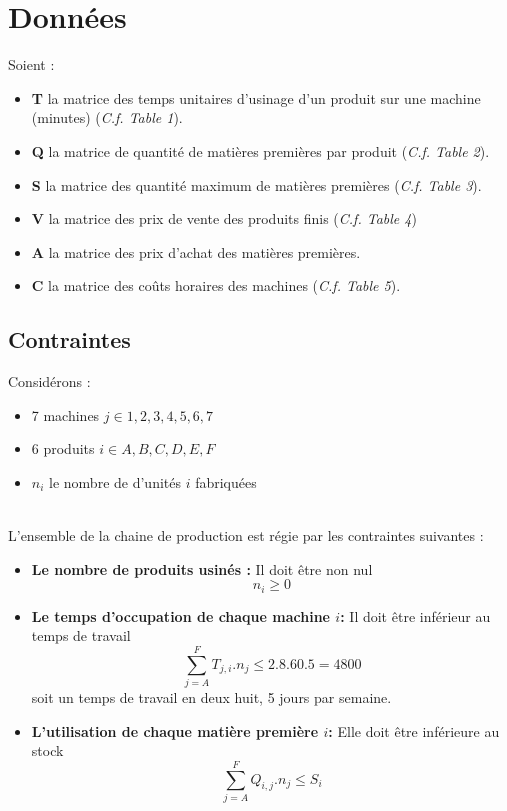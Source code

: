 
\section{Données}
Soient :
\begin{itemize}
  \item \textbf{T} la matrice des temps unitaires d'usinage d'un produit sur une
  machine (minutes) (\textsl{C.f. Table 1}).
  \item \textbf{Q} la matrice de quantité de matières premières par produit
  (\textsl{C.f. Table 2}).
  \item \textbf{S} la matrice des quantité maximum de matières premières
  (\textsl{C.f. Table 3}).
  \item \textbf{V} la matrice des prix de vente des produits finis (\textsl{C.f.
  Table 4})
  \item \textbf{A} la matrice des prix d'achat des matières premières.
  \item \textbf{C} la matrice des coûts horaires des machines (\textsl{C.f.
  Table 5}).
\end{itemize}

\subsection{Contraintes}
Considérons :
\begin{itemize}
  \item 7 machines $j \in {1, 2, 3, 4, 5, 6 ,7}$
  \item 6 produits $i \in {A, B, C, D, E, F}$
  \item $n_i$ le nombre de d'unités $i$ fabriquées
\end{itemize}
~\\
L'ensemble de la chaine de production est régie par les contraintes suivantes
:\\
\begin{itemize}
  \item \textbf{Le nombre de produits usinés :} Il doit être non nul
  \begin{equation} 
  	n_i \ge 0 \label{C0}
  \end{equation}
  
  \item \textbf{Le temps d'occupation de chaque machine $i$:} Il doit être
  inférieur au temps de travail
  \begin{equation} 
  	\sum_{j = A}^{F} T_{j,i} . n_j \leq 2.8.60.5 = 4800 \label{C1}
  \end{equation} 
  soit un temps de travail en deux huit, 5 jours par semaine.
  
  \item \textbf{L'utilisation de chaque matière première  $i$:} Elle doit être
  inférieure au stock
  \begin{equation} 
  	\sum_{j = A}^{F} Q_{i,j} . n_j \leq S_i \label{C2}
  \end{equation} 
\end{itemize}



